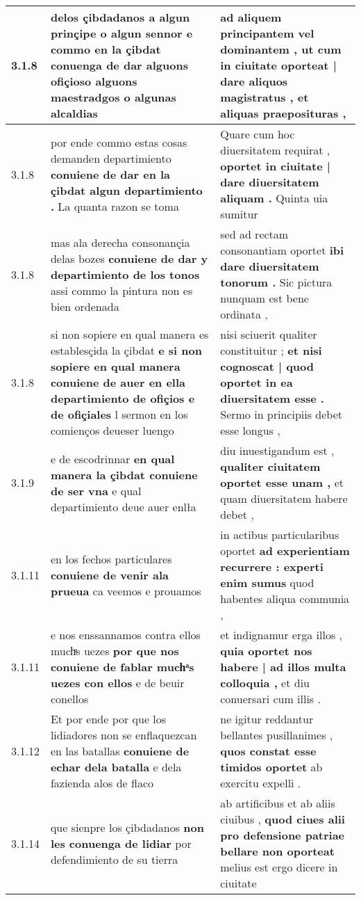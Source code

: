 \begin{tabular}{|p{1cm}|p{6.5cm}|p{6.5cm}|}
3.1.8 & delos çibdadanos a algun prinçipe o algun sennor \textbf{ e commo en la çibdat conuenga de dar alguons ofiçioso } alguons maestradgos o algunas alcaldias & ad aliquem principantem vel dominantem , \textbf{ ut cum in ciuitate oporteat | dare aliquos magistratus , } et aliquas praeposituras , \\\hline
3.1.8 & por ende commo estas cosas demanden departimiento \textbf{ conuiene de dar en la çibdat algun departimiento . } La quanta razon se toma & Quare cum hoc diuersitatem requirat , \textbf{ oportet in ciuitate | dare diuersitatem aliquam . } Quinta uia sumitur \\\hline
3.1.8 & mas ala derecha consonançia delas bozes \textbf{ conuiene de dar y departimiento de los tonos } assi commo la pintura non es bien ordenada & sed ad rectam consonantiam oportet \textbf{ ibi dare diuersitatem tonorum . } Sic pictura nunquam est bene ordinata , \\\hline
3.1.8 & si non sopiere en qual manera es establesçida la çibdat \textbf{ e si non sopiere en qual manera conuiene de auer en ella departimiento de ofiçios e de ofiçiales } l sermon en los comienços deueser luengo & nisi sciuerit qualiter constituitur ; \textbf{ et nisi cognoscat | quod oportet in ea diuersitatem esse . } Sermo in principiis debet esse longus , \\\hline
3.1.9 & e de escodrinnar \textbf{ en qual manera la çibdat conuiene de ser vna } e qual departimiento deue auer enlła & diu inuestigandum est , \textbf{ qualiter ciuitatem oportet esse unam , } et quam diuersitatem habere debet , \\\hline
3.1.11 & en los fechos particulares \textbf{ conuiene de venir ala prueua } ca veemos e prouamos & in actibus particularibus oportet \textbf{ ad experientiam recurrere : experti enim sumus } quod habentes aliqua communia , \\\hline
3.1.11 & e nos enssannamos contra ellos muchͣs uezes \textbf{ por que nos conuiene de fablar muchͣs uezes con ellos } e de beuir conellos & et indignamur erga illos , \textbf{ quia oportet nos habere | ad illos multa colloquia , } et diu conuersari cum illis . \\\hline
3.1.12 & Et por ende por que los lidiadores non se enflaquezcan en las batallas \textbf{ conuiene de echar dela batalla } e dela fazienda alos de flaco & ne igitur reddantur bellantes pusillanimes , \textbf{ quos constat esse timidos oportet } ab exercitu expelli . \\\hline
3.1.14 & que sienpre los çibdadanos \textbf{ non les conuenga de lidiar } por defendimiento de su tierra & ab artificibus et ab aliis ciuibus , \textbf{ quod ciues alii pro defensione patriae bellare non oporteat } melius est ergo dicere in ciuitate \\\hline

\end{tabular}

